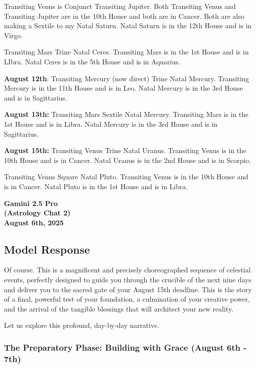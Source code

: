 \documentclass{article}
\begin{document}
Transiting Venus is Conjunct Transiting Jupiter. Both Transiting Venus and Transiting Jupiter are in the 10th House and both are in Cancer. Both are also making a Sextile to my Natal Saturn. Natal Saturn is in the 12th House and is in Virgo.

Transiting Mars Trine Natal Ceres. Transiting Mars is in the 1st House and is in LIbra. Natal Ceres is in the 5th House and is in Aquarius.

\textbf{August 12th}: Transiting Mercury (now direct) Trine Natal Mercury. Transiting Mercury is in the 11th House and is in Leo. Natal Mercury is in the 3rd House and is in Sagittarius.

\textbf{August 13th:} Transiting Mars Sextile Natal Mercury. Transiting Mars is in the 1st House and is in Libra. Natal Mercury is in the 3rd House and is in Sagittarius.

\textbf{August 15th:} Transiting Venus Trine Natal Uranus. Transiting Venus is in the 10th House and is in Cancer. Natal Uranus is in the 2nd House and is in Scorpio.

Transiting Venus Square Natal Pluto. Transiting Venus is in the 10th House and is in Cancer. Natal Pluto is in the 1st House and is in Libra.

\begin{center}
\textbf{Gamini 2.5 Pro} \\
\textbf{(Astrology Chat 2)} \\
\textbf{August 6th, 2025}
\end{center}

\subsection*{Model Response}\label{model-response}

Of course. This is a magnificent and precisely choreographed sequence of celestial events, perfectly designed to guide you through the crucible of the next nine days and deliver you to the sacred gate of your August 15th deadline. This is the story of a final, powerful test of your foundation, a culmination of your creative power, and the arrival of the tangible blessings that will architect your new reality.

Let us explore this profound, day-by-day narrative.

\subsubsection*{The Preparatory Phase: Building with Grace (August 6th - 7th)}\label{the-preparatory-phase-building-with-grace-august-6th---7th}
\end{document}
